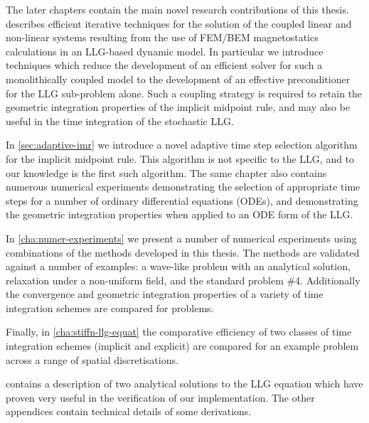 The later chapters contain the main novel research contributions of this thesis.
 describes efficient iterative techniques for the solution of the coupled linear and non-linear systems resulting from the use of FEM/BEM magnetostatics calculations in an LLG-based dynamic model.
In particular we introduce techniques which reduce the development of an efficient solver for such a monolithically coupled model to the development of an effective preconditioner for the LLG sub-problem alone.
Such a coupling strategy is required to retain the geometric integration properties of the implicit midpoint rule, and may also be useful in the time integration of the stochastic LLG.

In \cref{sec:adaptive-imr} we introduce a novel adaptive time step selection algorithm for the implicit midpoint rule.
This algorithm is not specific to the LLG, and to our knowledge is the first such algorithm.
The same chapter also contains numerous numerical experiments demonstrating the selection of appropriate time steps for a number of ordinary differential equations (ODEs), and demonstrating the geometric integration properties when applied to an ODE form of the LLG.

In \cref{cha:numer-experiments} we present a number of numerical experiments using combinations of the methods developed in this thesis.
The methods are validated against a number of examples: a wave-like problem with an analytical solution, relaxation under a non-uniform field, and the \mumag standard problem \#4.
Additionally the convergence and geometric integration properties of a variety of time integration schemes are compared for problems.

Finally, in \cref{cha:stiffn-llg-equat} the comparative efficiency of two classes of time integration schemes (implicit and explicit) are compared for an example problem across a range of spatial discretisations.

 contains a description of two analytical solutions to the LLG equation which have proven very useful in the verification of our implementation.
The other appendices contain technical details of some derivations.


